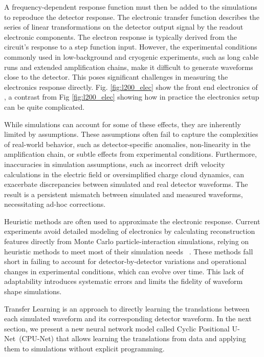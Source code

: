 A frequency-dependent response function must then be added to the simulations to reproduce the detector response. The electronic transfer function describes the series of linear transformations on the detector output signal by the readout electronic components. The electron response is typically derived from the circuit's response to a step function input. However, the experimental conditions commonly used in low-background and cryogenic experiments, such as long cable runs and extended amplification chains, make it difficult to generate waveforms close to the detector. This poses significant challenges in measuring the electronics response directly. Fig. \ref{fig:l200_elec} show the front end electronics of {\Ltwo}, a contrast from Fig \ref{fig:l200_elec} showing how in practice the electronics setup can be quite complicated.

While simulations can account for some of these effects, they are inherently limited by assumptions. These assumptions often fail to capture the complexities of real-world behavior, such as detector-specific anomalies, non-linearity in the amplification chain, or subtle effects from experimental conditions. Furthermore, inaccuracies in simulation assumptions, such as incorrect drift velocity calculations in the electric field or oversimplified charge cloud dynamics, can exacerbate discrepancies between simulated and real detector waveforms. The result is a persistent mismatch between simulated and measured waveforms, necessitating ad-hoc corrections. 

Heuristic methods are often used to approximate the electronic response. Current experiments avoid detailed modeling of electronics by calculating reconstruction features directly from Monte Carlo particle-interaction simulations, relying on heuristic methods to meet most of their simulation needs ~\cite{Ben_Thesis,Sam_Thesis}. These methods fall short in failing to account for detector-by-detector variations and operational changes in experimental conditions, which can evolve over time. This lack of adaptability introduces systematic errors and limits the fidelity of waveform shape simulations.


Transfer Learning is an approach to directly learning the translations between each simulated waveform and its corresponding detector waveform. In the next section, we present a new neural network model called Cyclic Positional U-Net~(CPU-Net) that allows learning the translations from data and applying them to simulations without explicit programming.

